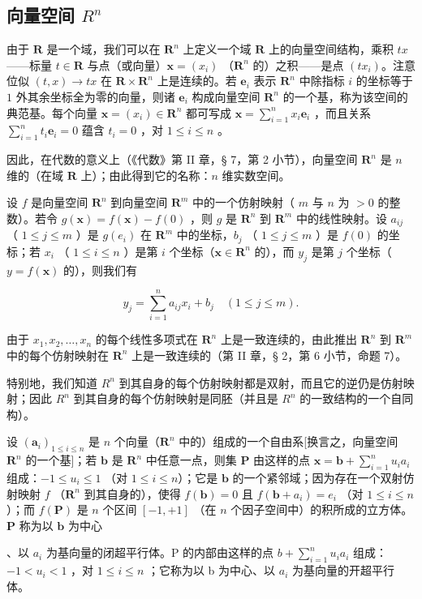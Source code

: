 \subsection{\texorpdfstring{向量空间 \(R^{n}\)}{向量空间 R 的 n 次幂}}

由于 \(\mathbf{R}\) 是一个域，我们可以在 \(\mathbf{R}^n\) 上定义一个域 \(\mathbf{R}\) 上的向量空间结构，乘积 \(tx\) ——标量 \(t \in \mathbf{R}\) 与点（或向量）\(\boldsymbol{x} = (x_i)\) （\(\mathbf{R}^n\) 的）之积——是点 \((tx_i)\)。注意位似 \((t, x) \to tx\) 在 \(\mathbf{R} \times \mathbf{R}^n\) 上是连续的。若 \(\boldsymbol{e}_i\) 表示 \(\mathbf{R}^n\) 中除指标 \(i\) 的坐标等于 \(1\) 外其余坐标全为零的向量，则诸 \(\boldsymbol{e}_i\) 构成向量空间 \(\mathbf{R}^n\) 的一个基，称为该空间的典范基。每个向量 \(\boldsymbol{x} = (x_i) \in \mathbf{R}^n\) 都可写成 \(\boldsymbol{x} = \sum_{i=1}^{n} x_i \boldsymbol{e}_i\) ，而且关系 \(\sum_{i=1}^{n} t_i \boldsymbol{e}_i = 0\) 蕴含 \(t_i = 0\) ，对 \(1 \leqslant i \leqslant n\) 。

因此，在代数的意义上（《代数》第 II 章，§ 7，第 2 小节），向量空间 \(\mathbf{R}^n\) 是 \(n\) 维的（在域 \(\mathbf{R}\) 上）；由此得到它的名称：\(n\) 维实数空间。

设 \(f\) 是向量空间 \(\mathbf{R}^n\) 到向量空间 \(\mathbf{R}^m\) 中的一个仿射映射（ \(m\) 与 \(n\) 为 \(>0\) 的整数）。若令 \(g(\boldsymbol{x}) = f(\boldsymbol{x}) - f(0)\) ，则 \(g\) 是 \(\mathbf{R}^n\) 到 \(\mathbf{R}^m\) 中的线性映射。设 \(a_{ij}\) （ \(1 \leqslant j \leqslant m\) ）是 \(g(e_i)\) 在 \(\mathbf{R}^m\) 中的坐标，\(b_j\) （ \(1 \leqslant j \leqslant m\) ）是 \(f(0)\) 的坐标；若 \(x_i\) （ \(1 \leqslant i \leqslant n\) ）是第 \(i\) 个坐标（\(\boldsymbol{x} \in \mathbf{R}^n\) 的），而 \(y_j\) 是第 \(j\) 个坐标（\(y = f(\boldsymbol{x})\) 的），则我们有

\[
y _ {j} = \sum_ {i = 1} ^ {n} a _ {i j} x _ {i} + b _ {j} \quad (1 \leqslant j \leqslant m).
\]

由于 \(x_1, x_2, \ldots, x_n\) 的每个线性多项式在 \(\mathbf{R}^n\) 上是一致连续的，由此推出 \(\mathbf{R}^n\) 到 \(\mathbf{R}^m\) 中的每个仿射映射在 \(\mathbf{R}^n\) 上是一致连续的（第 II 章，§ 2，第 6 小节，命题 7）。

特别地，我们知道 \(R^{n}\) 到其自身的每个仿射映射都是双射，而且它的逆仍是仿射映射；因此 \(R^{n}\) 到其自身的每个仿射映射是同胚（并且是 \(R^{n}\) 的一致结构的一个自同构）。

设 \((\pmb{a}_i)_{1\leqslant i\leqslant n}\) 是 \(n\) 个向量（\(\mathbf{R}^n\) 中的）组成的一个自由系{[}换言之，向量空间 \(\mathbf{R}^n\) 的一个基{]}；若 \(\pmb{b}\) 是 \(\mathbf{R}^n\) 中任意一点，则集 \(\mathbf{P}\) 由这样的点 \(\pmb{x} = \pmb{b} + \sum_{i=1}^{n} u_i a_i\) 组成：\(-1 \leqslant u_i \leqslant 1\) （对 \(1 \leqslant i \leqslant n\)）；它是 \(\pmb{b}\) 的一个紧邻域；因为存在一个双射仿射映射 \(f\) （\(\mathbf{R}^n\) 到其自身的），使得 \(f(\pmb{b}) = 0\) 且 \(f(\pmb{b} + a_i) = e_i\) （对 \(1 \leqslant i \leqslant n\)）；而 \(f(\mathbf{P})\) 是 \(n\) 个区间 \([-1, +1]\) （在 \(n\) 个因子空间中）的积所成的立方体。\(\mathbf{P}\) 称为以 \(\pmb{b}\) 为中心

、以 \(a_{i}\) 为基向量的闭超平行体。P 的内部由这样的点 \(b + \sum_{i=1}^{n} u_{i} a_{i}\) 组成：\(-1 < u_{i} < 1\) ，对 \(1 \leqslant i \leqslant n\) ；它称为以 b 为中心、以 \(a_{i}\) 为基向量的开超平行体。

